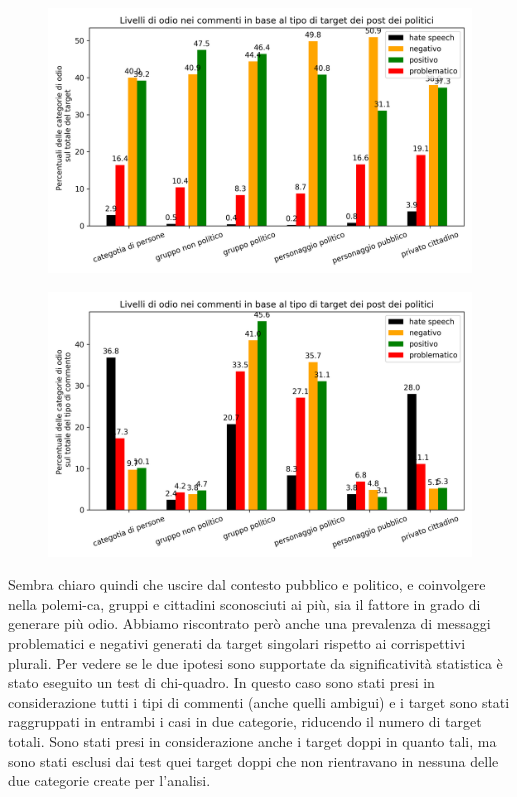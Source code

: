 \begin{figure}
	\centering
	\begin{minipage}{.5\textwidth}
		\centering
		\includegraphics[width=\linewidth]{figures/targetuniqpercent}
		\label{fig:targetuniqpercent}
	\end{minipage}%
	\begin{minipage}{.5\textwidth}
		\centering
		\includegraphics[width=\linewidth]{figures/targetuniqpercent2}
		\label{fig:targetuniqpercent2}
	\end{minipage}
\end{figure}

Sembra chiaro quindi che uscire dal contesto pubblico e politico, e coinvolgere nella polemi-ca, gruppi e cittadini sconosciuti ai più,  sia il fattore in grado di generare più odio. Abbiamo riscontrato però anche una prevalenza di messaggi problematici e negativi generati da target singolari rispetto ai corrispettivi plurali. Per vedere se le due ipotesi sono supportate da significatività statistica è stato eseguito un test di chi-quadro.
In questo caso sono stati presi in considerazione tutti i tipi di commenti (anche quelli ambigui) e i target sono stati raggruppati in entrambi i casi in due categorie, riducendo il numero di target totali. Sono stati presi in considerazione anche i target doppi in quanto tali, ma sono stati esclusi dai test quei target doppi che non rientravano in nessuna delle due categorie create per l'analisi.

